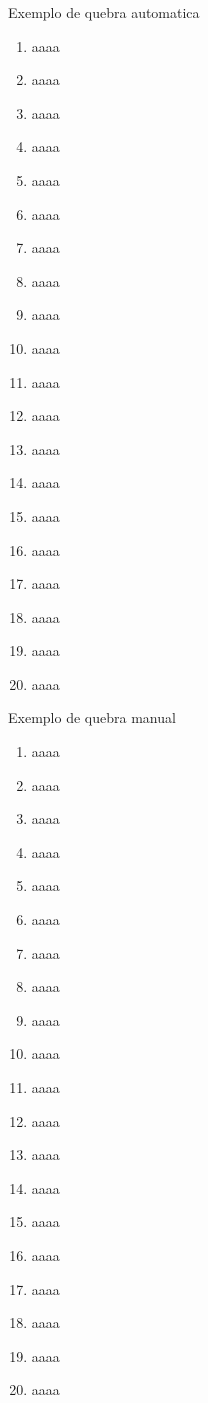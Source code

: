 \documentclass[%
    english,
    brazil]{ifsp-spo-beamer}
\begin{document}
\begin{frame}[allowframebreaks=0.8]{Exemplo de quebra automatica}
    \begin{enumerate}
        \item aaaa
        \item aaaa
        \item aaaa
        \item aaaa
        \item aaaa
        \item aaaa
        \item aaaa
        \item aaaa
        \item aaaa
        \item aaaa
        \item aaaa
        \item aaaa
        \item aaaa
        \item aaaa
        \item aaaa
        \item aaaa
        \item aaaa
        \item aaaa
        \item aaaa
        \item aaaa
    \end{enumerate}
\end{frame}

\begin{frame}[allowframebreaks]{Exemplo de quebra manual}
    \begin{enumerate}
        \item aaaa
        \item aaaa
        \item aaaa
        \item aaaa
        \item aaaa
        \item aaaa
        \item aaaa
        \item aaaa
        \item aaaa
        \item aaaa
        \item aaaa
        
        \framebreak
        
        \item aaaa
        \item aaaa
        \item aaaa
        \item aaaa
        \item aaaa
        \item aaaa
        \item aaaa
        \item aaaa
        \item aaaa
    \end{enumerate}
\end{frame}
\end{document}

